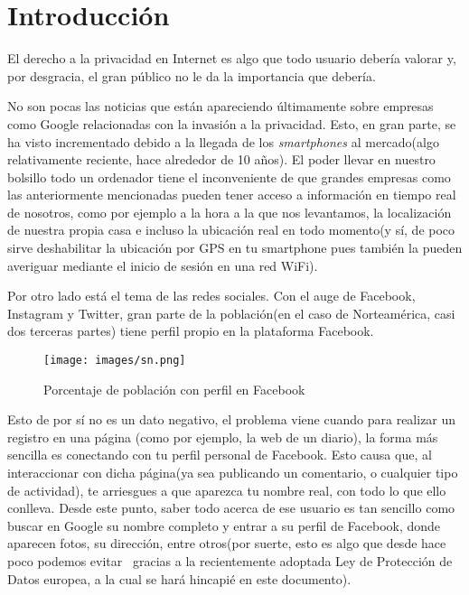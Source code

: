 \chapter{Introducción} 
\label{chap:intro}

\vspace{-0.2cm}


El derecho a la privacidad en Internet es algo que todo usuario debería valorar y, por desgracia, el gran público no le da la importancia que debería. ~\cite{book:PrivacyBigDataPublicGood}

No son pocas las noticias que están apareciendo últimamente sobre empresas como Google relacionadas con la invasión a la privacidad. Esto, en gran parte, se ha visto incrementado debido a la llegada de los \textit{smartphones} al mercado(algo relativamente reciente, hace alrededor de 10 años). El poder llevar en nuestro bolsillo todo un ordenador tiene el inconveniente de que grandes empresas como las anteriormente mencionadas pueden tener acceso a información en tiempo real de nosotros, como por ejemplo a la hora a la que nos levantamos, la localización de nuestra propia casa e incluso la ubicación real en todo momento(y sí, de poco sirve deshabilitar la ubicación por GPS en tu smartphone pues también la pueden averiguar mediante el inicio de sesión en una red WiFi).

Por otro lado está el tema de las redes sociales. Con el auge de Facebook, Instagram y Twitter, gran parte de la población(en el caso de Norteamérica, casi dos terceras partes) tiene perfil propio en la plataforma Facebook.

\begin{figure}[h]
	\centerline{
		\mbox{\texttt{[image: images/sn.png]}}
	}
	\caption{Porcentaje de población con perfil en Facebook~\cite{article:FacebookStats} }
	\label{fig:norm_Daugman}
\end{figure}

Esto de por sí no es un dato negativo, el problema viene cuando para realizar un registro en una página (como por ejemplo, la web de un diario), la forma más sencilla es conectando con tu perfil personal de Facebook. Esto causa que, al interaccionar con dicha página(ya sea publicando un comentario, o cualquier tipo de actividad), te arriesgues a que aparezca tu nombre real, con todo lo que ello conlleva. Desde este punto, saber todo acerca de ese usuario es tan sencillo como buscar en Google su nombre completo y entrar a su perfil de Facebook, donde aparecen fotos, su dirección, entre otros(por suerte, esto es algo que desde hace poco podemos evitar~\cite{article:GDPRGoogle} gracias a la recientemente adoptada Ley de Protección de Datos europea, a la cual se hará hincapié en este documento).

